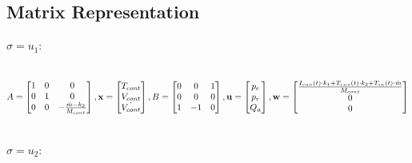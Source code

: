 \documentclass[a4paper,12pt,twoside,openright]{book}
\begin{document}
\subsection{Matrix Representation}


$\sigma = u_1:$

\vspace{5mm}

\hbox{
$A = 
\begin{bmatrix}
  1 & 0 & 0\\
  0 & 1 & 0\\
  0 & 0 & -\frac{\dot{m}-k_2}{M_{cont}}
\end{bmatrix},
\mathbf{x} =
\begin{bmatrix}
  T_{cont} \\
  V_{cont}\\
  \dot{V_{cont}}
\end{bmatrix},
B = 
\begin{bmatrix}
  0 & 0 & 1\\
  0 & 0 & 0\\
  1 & -1 & 0\\
\end{bmatrix},
\mathbf{u} =
\begin{bmatrix}
  p_{e}\\
  p_{r}\\
  Q_{a}\\
\end{bmatrix},
\mathbf{w} =
\begin{bmatrix}
  \frac{I_{env}(t)\cdot{k_1}+T_{env}(t)\cdot{k_2}+T_{in}(t)\cdot\dot{m}}{M_{cont}}\\
  0\\
  0\\
\end{bmatrix}
$
}

\vspace{5mm}

$\sigma = u_2:$ 

\vspace{5mm}
\end{document}
